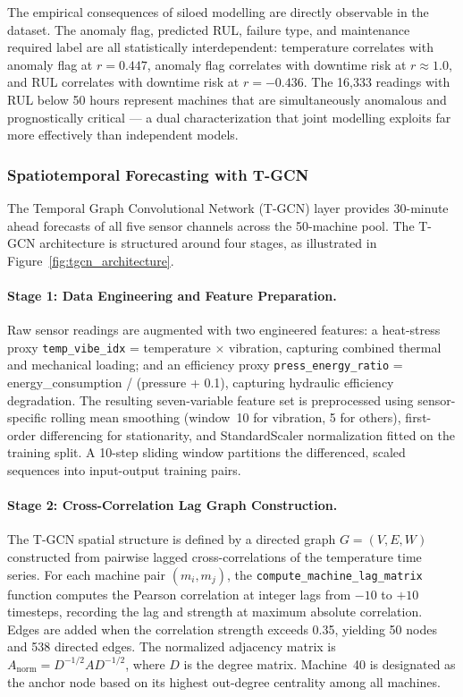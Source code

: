 The empirical consequences of siloed modelling are directly observable in the dataset. The anomaly flag, predicted RUL, failure type, and maintenance required label are all statistically interdependent: temperature correlates with anomaly flag at $r = 0.447$, anomaly flag correlates with downtime risk at $r \approx 1.0$, and RUL correlates with downtime risk at $r = -0.436$. The 16,333 readings with RUL below 50 hours represent machines that are simultaneously anomalous and prognostically critical --- a dual characterization that joint modelling exploits far more effectively than independent models.

\subsubsection{Spatiotemporal Forecasting with T-GCN}

The Temporal Graph Convolutional Network (T-GCN) layer provides 30-minute ahead forecasts of all five sensor channels across the 50-machine pool. The T-GCN architecture is structured around four stages, as illustrated in Figure~\ref{fig:tgcn_architecture}.



\paragraph{Stage 1: Data Engineering and Feature Preparation.} Raw sensor readings are augmented with two engineered features: a heat-stress proxy \texttt{temp\_vibe\_idx} = temperature $\times$ vibration, capturing combined thermal and mechanical loading; and an efficiency proxy \texttt{press\_energy\_ratio} = energy\_consumption / (pressure + 0.1), capturing hydraulic efficiency degradation. The resulting seven-variable feature set is preprocessed using sensor-specific rolling mean smoothing (window~10 for vibration, 5 for others), first-order differencing for stationarity, and StandardScaler normalization fitted on the training split. A 10-step sliding window partitions the differenced, scaled sequences into input-output training pairs.

\paragraph{Stage 2: Cross-Correlation Lag Graph Construction.} The T-GCN spatial structure is defined by a directed graph $G = (V, E, W)$ constructed from pairwise lagged cross-correlations of the temperature time series. For each machine pair $(m_i, m_j)$, the \texttt{compute\_machine\_lag\_matrix} function computes the Pearson correlation at integer lags from $-10$ to $+10$ timesteps, recording the lag and strength at maximum absolute correlation. Edges are added when the correlation strength exceeds 0.35, yielding 50 nodes and 538 directed edges. The normalized adjacency matrix is $A_{\text{norm}} = D^{-1/2} A D^{-1/2}$, where $D$ is the degree matrix. Machine~40 is designated as the anchor node based on its highest out-degree centrality among all machines.


